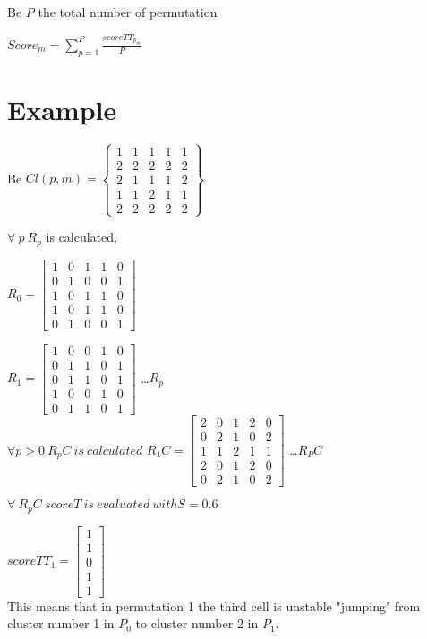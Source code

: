 \documentclass[12pt]{article}
\begin{document}
Be $P$ the total number of permutation 

$Score_m= \sum\limits_{p=1}^P \frac{scoreTT_{p_m}}{P} $


\section{Example}
Be $Cl(p,m)= \begin{Bmatrix}
 1 & 1 & 1 & 1 & 1 \\
 2 & 2 & 2 & 2 & 2 \\
 2 & 1 & 1 & 1 & 2 \\
 1 & 1 & 2 & 1 & 1 \\
 2 & 2 & 2 & 2 & 2 
\end{Bmatrix}  $

$\forall \ p  \ R_p $ is calculated, 

$ R_0=\begin{bmatrix}
1 & 0 & 1 & 1 & 0 \\
0 & 1 & 0 & 0 & 1 \\
1 & 0 & 1 & 1 & 0 \\
1 & 0 & 1 & 1 & 0 \\
0 & 1 & 0 & 0 & 1 
\end{bmatrix}  $

$ R_1=\begin{bmatrix}
1 & 0 & 0 & 1 & 0 \\
0 & 1 & 1 & 0 & 1 \\
0 & 1 & 1 & 0 & 1 \\
1 & 0 & 0 & 1 & 0 \\
0 & 1 & 1 & 0 & 1 
\end{bmatrix}  $
\dots $R_p$
\\
$ \forall p > 0 \ R_pC \ is \ calculated$
$ R_1C=\begin{bmatrix}
2 & 0 & 1 & 2 & 0 \\
0 & 2 & 1 & 0 & 2 \\
1 & 1 & 2 & 1 & 1 \\
2 & 0 & 1 & 2 & 0 \\
0 & 2 & 1 & 0 & 2 
\end{bmatrix}  $
\dots $R_PC$

$ \forall \ R_pC \ scoreT \ is \ evaluated \ with S=0.6$

$ scoreTT_1=\begin{bmatrix}
1 \\
1 \\
0 \\
1 \\
1 
\end{bmatrix}  $
\\ This means that in permutation 1 the third cell is unstable "jumping" from cluster number 1 in $P_0$ to cluster number 2 in $P_1$.
\end{document}
